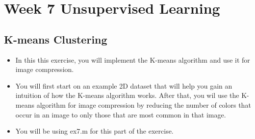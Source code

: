 \documentclass[11pt]{article} %
\begin{document}
	
\section{Week 7 Unsupervised Learning}
\subsection{K-means Clustering}


\begin{itemize}
	\item In this this exercise, you will implement the K-means algorithm and use it for image compression.
	
	\item You will first start on an example 2D dataset that will help you gain an intuition of
	how the K-means algorithm works. After that, you wil use the K-means algorithm for image
	compression by reducing the number of colors that occur in an image to only those that are most common in that image.
	
	\item You will be using ex7.m for this part of the exercise.
	
\end{itemize}
\end{document}
